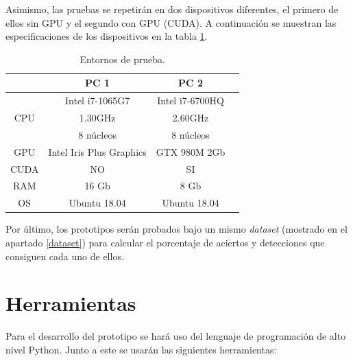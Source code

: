 Asimismo, las pruebas se repetirán en dos dispositivos diferentes, el primero de ellos sin GPU y el segundo con GPU (CUDA). A continuación se muestran las especificaciones de los dispositivos en la tabla \ref{tab:table1}.

\begin{table}[h!]
	\begin{center}
		\begin{tabular}{ |c|c|c|c| } 
			\hline
			 & PC 1 & PC 2 \\
			\hline
			\multirow{3}{4em}{CPU} & Intel i7-1065G7 & Intel i7-6700HQ \\ 
			& 1.30GHz & 2.60GHz \\ 
			& 8 núcleos & 8 núcleos \\ 
			\hline
			GPU & Intel Iris Plus Graphics  & GTX 980M 2Gb \\
			\hline
			CUDA & NO  & SI \\
			\hline
			RAM & 16 Gb & 8 Gb \\
			\hline
			OS & Ubuntu 18.04 & Ubuntu 18.04 \\
			\hline
		\end{tabular}
		\caption{Entornos de prueba.}
		\label{tab:table1}
	\end{center}
\end{table}

Por último, los prototipos serán probados bajo un mismo \textit{dataset} (mostrado en el apartado \ref{dataset}) para calcular el porcentaje de aciertos y detecciones que consiguen cada uno de ellos.

\vspace{-0.9cm}
\section{Herramientas}
\vspace{-0.5cm}

Para el desarrollo del prototipo se hará uso del lenguaje de programación de alto nivel Python. Junto a este se usarán las siguientes herramientas:

